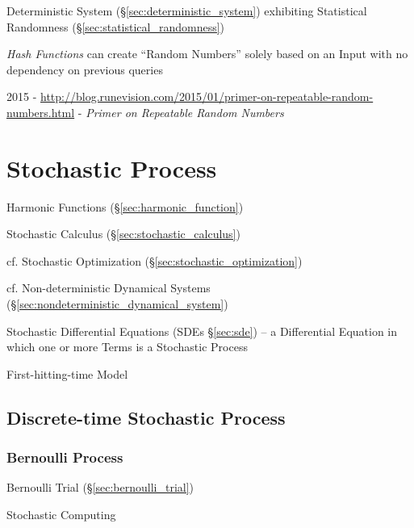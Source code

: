Deterministic System (\S\ref{sec:deterministic_system}) exhibiting Statistical
Randomness (\S\ref{sec:statistical_randomness})

\emph{Hash Functions} can create ``Random Numbers'' solely based on an Input
with no dependency on previous queries

2015 -
\url{http://blog.runevision.com/2015/01/primer-on-repeatable-random-numbers.html}
- \emph{Primer on Repeatable Random Numbers}



\section{Stochastic Process}\label{sec:stochastic_process}


Harmonic Functions (\S\ref{sec:harmonic_function})

\fist Stochastic Calculus (\S\ref{sec:stochastic_calculus})

\fist cf. Stochastic Optimization (\S\ref{sec:stochastic_optimization})

\fist cf. Non-deterministic Dynamical Systems
(\S\ref{sec:nondeterministic_dynamical_system})

\fist Stochastic Differential Equations (SDEs \S\ref{sec:sde}) -- a Differential
Equation in which one or more Terms is a Stochastic Process

First-hitting-time Model



\subsection{Discrete-time Stochastic Process}
\label{sec:discretetime_stochastic}

\subsubsection{Bernoulli Process}\label{sec:bernoulli_process}

Bernoulli Trial (\S\ref{sec:bernoulli_trial})

Stochastic Computing



